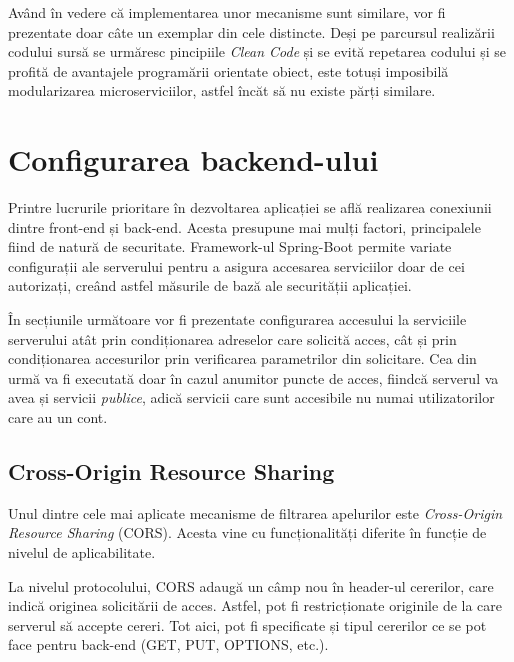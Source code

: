 \documentclass[12pt,a4paper]{report}
\theoremstyle{definition}
\theoremstyle{remark}
\begin{document}
\par Având în vedere că implementarea unor mecanisme sunt similare, vor fi prezentate doar câte un exemplar din cele distincte. Deși pe parcursul realizării codului sursă se urmăresc pincipiile \textit{Clean Code}\cite{martin2009clean} și se evită repetarea codului și se profită de avantajele programării orientate obiect, este totuși imposibilă modularizarea microserviciilor, astfel încăt să nu existe părți similare.

\section{Configurarea backend-ului}
\par Printre lucrurile prioritare în dezvoltarea aplicației se află realizarea conexiunii dintre front-end și back-end. Acesta presupune mai mulți factori, principalele fiind de natură de securitate. Framework-ul Spring-Boot permite variate configurații ale serverului pentru a asigura accesarea serviciilor doar de cei autorizați, creând astfel măsurile de bază ale securității aplicației\cite{scarioni2019pro}.

\par În secțiunile următoare vor fi prezentate configurarea accesului la serviciile serverului atât prin condiționarea adreselor care solicită acces, cât și prin condiționarea accesurilor prin verificarea parametrilor din solicitare. Cea din urmă va fi executată doar în cazul anumitor puncte de acces, fiindcă serverul va avea și servicii \textit{publice}, adică servicii care sunt accesibile nu numai utilizatorilor care au un cont.

\subsection{Cross-Origin Resource Sharing}
\par Unul dintre cele mai aplicate mecanisme de filtrarea apelurilor este \textit{Cross-Origin Resource Sharing}\cite{gibbinscross} (CORS). Acesta vine cu funcționalități diferite în funcție de nivelul de aplicabilitate.

\par La nivelul protocolului, CORS adaugă un câmp nou în header-ul cererilor, care indică originea solicitării de acces. Astfel, pot fi restricționate originile de la care serverul să accepte cereri. Tot aici, pot fi specificate și tipul cererilor ce se pot face pentru back-end (GET, PUT, OPTIONS, etc.).
\end{document}
